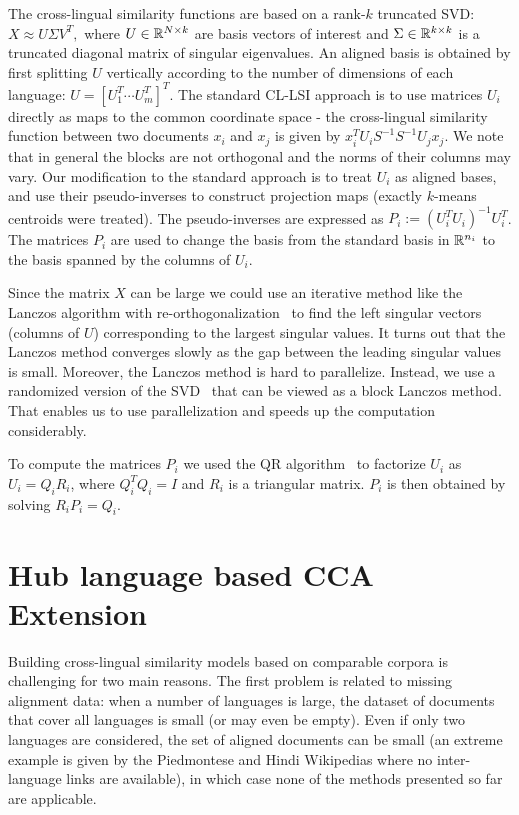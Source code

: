 The cross-lingual similarity functions are based on a rank-$k$ truncated SVD:
$X \approx U \Sigma V^T,$ where $U \in \mathbb{R}^{N \times k}$ are basis vectors of
interest and $\Sigma \in \mathbb{R}^{k \times k}$ is a truncated diagonal matrix of singular
eigenvalues. An aligned basis is obtained by first splitting $U$ vertically according
to the number of dimensions of each language: $U = [U_1^T \cdots U_m^T]^T$. 
The standard CL-LSI approach is to use matrices $U_i$ directly as maps to the common
coordinate space - the cross-lingual similarity function between two documents $x_i$ and
$x_j$ is given by $x_i^T U_i S^{-1} S^{-1} U_j x_j$. We note that in general the blocks
are not orthogonal and the norms of their columns may vary. Our modification to the
standard approach is to treat $U_i$ as aligned bases, and use their pseudo-inverses
to construct projection maps (exactly $k$-means centroids were treated). 
The pseudo-inverses are expressed as $P_i := (U_i^T U_i)^{-1} U_i^T$.
The matrices $P_i$ are used to change the basis from the standard basis in $\mathbb{R}^{n_i}$ to the
basis spanned by the columns of $U_i$.

Since the matrix $X$ can be large we could use an iterative method like the Lanczos
algorithm with re-orthogonalization~\cite{golub} to find the left singular vectors
(columns of $U$) corresponding to the largest singular values. It turns out that the
Lanczos method converges slowly as the gap between the leading singular values is small.
Moreover, the Lanczos method is hard to parallelize. Instead, we use a randomized version
of the SVD~\cite{tropp} that can be viewed as a block Lanczos method. That enables us
to use parallelization and speeds up the computation considerably.

To compute the matrices $P_i$ we used the QR algorithm~\cite{golub} to factorize
$U_i$ as $U_i = Q_i R_i$, where $Q_i^TQ_i = I$ and $R_i$ is a triangular matrix.
$P_i$ is then obtained by solving $R_i P_i = Q_i$.


\section{Hub language based CCA Extension}\label{chap:crosslingual:hublang}
Building cross-lingual similarity models based on comparable corpora is challenging for
two main reasons. The first problem is related to missing alignment data: when a number
of languages is large, the dataset of documents that cover all languages is small (or may
even be empty). Even if only two languages are considered, the set of aligned documents
can be small (an extreme example is given by the Piedmontese and Hindi Wikipedias where
no inter-language links are available), in which case none of the methods presented so
far are applicable.

